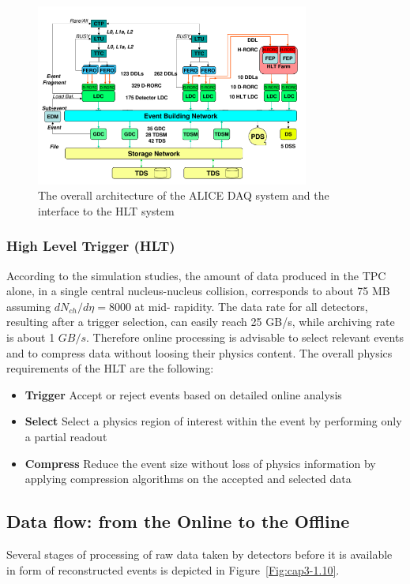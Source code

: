 \begin{figure}[t]
\centering
\includegraphics[width=0.8\textwidth]{Images/Chapter3/alice_daq}
\caption[ALICE DAQ system]{The overall architecture of the ALICE DAQ system and the interface to the HLT system}
\label{Fig:cap3-1.9}
\end{figure}


\subsubsection*{High Level Trigger (HLT)}
According to the simulation studies, the amount of data produced in the TPC alone, in a single central nucleus-nucleus collision, corresponds to about 75 MB assuming $dN_{ch}/d\eta = 8000$ at mid- rapidity. The data rate for all detectors, resulting after a trigger selection, can easily reach 25 GB/s, while archiving rate is about 1 $GB/s$. Therefore online processing is advisable to select relevant events and to compress data without loosing their physics content. The overall physics requirements of the HLT are the following:
\begin{itemize}
\item \textbf{Trigger} Accept or reject events based on detailed online analysis
\item \textbf{Select} Select a physics region of interest within the event by performing only a partial readout
\item \textbf{Compress} Reduce the event size without loss of physics information by applying compression algorithms on the accepted and selected data
\end{itemize}



\subsection{Data flow: from the Online to the Offline }
\label{par:3.2c}
Several stages of processing of raw data taken by detectors before it is available in form of reconstructed events is depicted in \mbox{Figure \ref{Fig:cap3-1.10}}.

